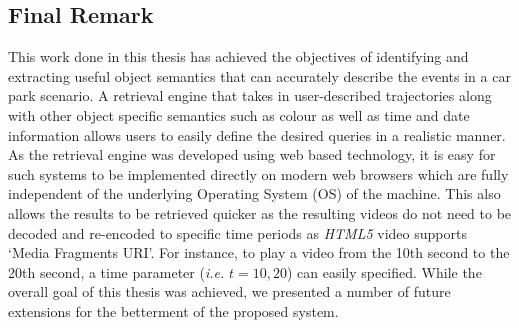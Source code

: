 \vspace{1em}
\subsection*{Final Remark}
This work done in this thesis has achieved the objectives of identifying and extracting useful object semantics that can accurately describe the events in a car park scenario. A retrieval engine that takes in user-described trajectories along with other object specific semantics such as colour as well as time and date information allows users to easily define the desired queries in a realistic manner. As the retrieval engine was developed using web based technology, it is easy for such systems to be implemented directly on modern web browsers which are fully independent of the underlying Operating System (OS) of the machine. This also allows the results to be retrieved quicker as the resulting videos do not need to be decoded and re-encoded to specific time periods as \emph{HTML5} video supports `Media Fragments URI'. For instance, to play a video from the 10th second to the 20th second, a time parameter (\emph{i.e.} $t=10,20$) can easily specified. While the overall goal of this thesis was achieved, we presented a number of future extensions for the betterment of the proposed system.